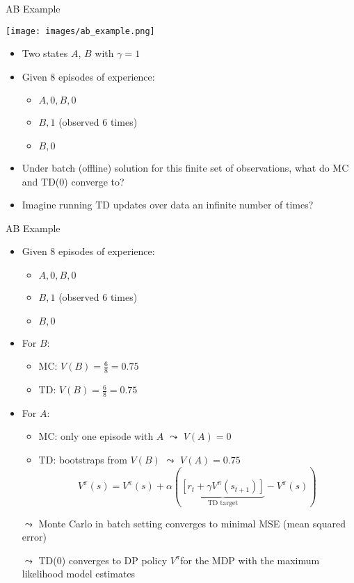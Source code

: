 \documentclass[aspectratio=169]{../latex_main/tntbeamer}  %
\begin{document}
\begin{frame}[c]{AB Example~}
	
	\centering\vspace{-1em}
	\texttt{[image: images/ab\_example.png]}
	
	\begin{itemize}
		\item Two states $A$, $B$ with $\gamma = 1$
		\item Given $8$ episodes of experience:
		\begin{itemize}
			\item $A, 0, B, 0$
			\item $B, 1$ (observed $6$ times)
			\item $B, 0$ 
		\end{itemize}
		\item Under batch (offline) solution for this finite set of observations, what do MC and TD(0) converge to?
		\item Imagine running TD updates over data an infinite number of times?
	\end{itemize}
	
\end{frame}
\begin{frame}[c]{AB Example~}

\begin{itemize}
	\item Given $8$ episodes of experience:
	\begin{itemize}
		\item $A, 0, B, 0$
		\item $B, 1$ (observed $6$ times)
		\item $B, 0$ 
	\end{itemize}
	\item For $B$:
	\begin{itemize}
		\item MC: $V(B) = \frac{6}{8} =  0.75$
		\item TD: $V(B) = \frac{6}{8} =  0.75$
	\end{itemize} 
	\pause
	\item For $A$:
	\begin{itemize}
		\item MC: only one episode with $A$ $\leadsto$ $V(A) = 0$ 
		\item TD: bootstraps from $V(B)$ $\leadsto$ $V(A) = 0.75$
$$ V^\pi(s) = V^\pi(s) + \alpha (\underbrace{[r_t + \gamma V^\pi (s_{t+1})]}_{\text{TD target}} - V^\pi(s))$$
	\end{itemize}	
	\medskip
	\item[$\leadsto$] Monte Carlo in batch setting converges to minimal \alert{MSE} (mean squared error)
	\item[$\leadsto$] TD(0) converges to DP policy $V^\pi$for the MDP with the \alert{maximum likelihood model estimates}
	
\end{itemize}
	
\end{frame}
\end{document}
